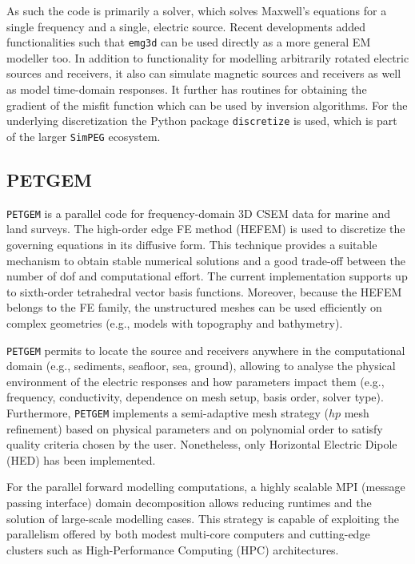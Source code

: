 \documentclass[extra, camera,%
]{gji}
\newcommand{\emg}[2]{\texttt{emg#1#2}\xspace}
\newcommand{\simpeg}{\texttt{SimPEG}\xspace}
\newcommand{\discretize}{\texttt{discretize}\xspace}
\newcommand{\petgem}{\texttt{PETGEM}\xspace}
\begin{document}
As such the code is primarily a solver, which solves Maxwell's equations for a single frequency and a single, electric source. Recent developments added functionalities such that \emg3d can be used directly as a more general EM modeller too. In addition to functionality for modelling arbitrarily rotated electric sources and receivers, it also can simulate magnetic sources and receivers as well as model time-domain responses. It further has routines for obtaining the gradient of the misfit function which can be used by inversion algorithms. For the underlying discretization the Python package \discretize is used, which is part of the larger \simpeg ecosystem.

\subsection{PETGEM}

\petgem is a parallel code for frequency-domain 3D CSEM data for marine and land surveys. The high-order edge FE method (HEFEM) is used to discretize the governing equations in its diffusive form. This technique provides a suitable mechanism to obtain stable numerical solutions and a good trade-off between the number of dof and computational effort. The current implementation supports up to sixth-order tetrahedral vector basis functions. Moreover, because the HEFEM belongs to the FE family, the unstructured meshes can be used efficiently on complex geometries (e.g., models with topography and bathymetry).

\petgem permits to locate the source and receivers anywhere in the computational domain (e.g., sediments, seafloor, sea, ground), allowing to analyse the physical environment of the electric responses and how parameters impact them (e.g., frequency, conductivity, dependence on mesh setup, basis order, solver type). Furthermore, \petgem implements a semi-adaptive mesh strategy ($hp$ mesh refinement) based on physical parameters and on polynomial order to satisfy quality criteria chosen by the user. Nonetheless, only Horizontal Electric Dipole (HED) has been implemented.

For the parallel forward modelling computations, a highly scalable MPI (message passing interface) domain decomposition allows reducing runtimes and the solution of large-scale modelling cases. This strategy is capable of exploiting the parallelism offered by both modest multi-core computers and cutting-edge clusters such as High-Performance Computing (HPC) architectures.
\end{document}

